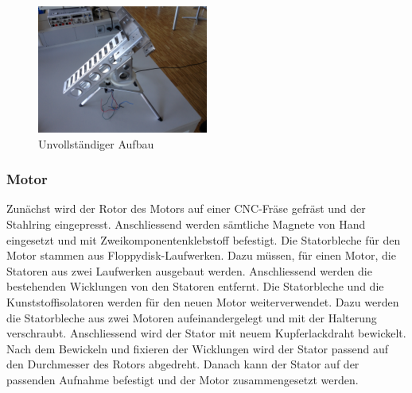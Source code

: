 \begin{figure}[h!]
	\centering
	\includegraphics[width=0.5\textwidth]{fig/IMG_2303.JPG}
	\caption{Unvollständiger Aufbau}
	\label{fig:Unvollständiger Aufbau}
\end{figure}
\FloatBarrier

\subsubsection{Motor}
Zunächst wird der Rotor des Motors auf einer CNC-Fräse gefräst und der 
Stahlring eingepresst. Anschliessend werden sämtliche Magnete von Hand 
eingesetzt und mit Zweikomponentenklebstoff befestigt. Die Statorbleche für 
den Motor stammen aus Floppydisk-Laufwerken. Dazu müssen, für einen Motor, die 
Statoren aus zwei Laufwerken ausgebaut werden. Anschliessend werden die 
bestehenden Wicklungen von den Statoren entfernt. Die Statorbleche und die 
Kunststoffisolatoren werden für den neuen Motor weiterverwendet. Dazu werden 
die Statorbleche aus zwei Motoren aufeinandergelegt und mit der Halterung 
verschraubt. Anschliessend wird der Stator mit neuem Kupferlackdraht 
bewickelt. Nach dem Bewickeln und fixieren der Wicklungen wird der Stator 
passend auf den Durchmesser des Rotors abgedreht. Danach kann der Stator auf 
der passenden Aufnahme befestigt und der Motor zusammengesetzt werden. 
